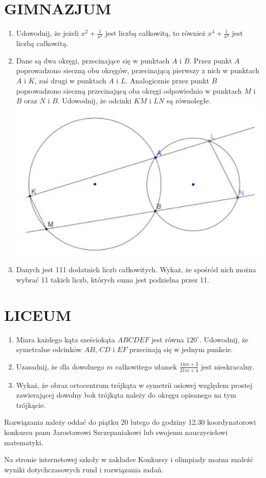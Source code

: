 \documentclass[10pt]{article}
\begin{document}
\section*{GIMNAZJUM}
\begin{enumerate}
  \item Udowodnij, że jeżeli \(x^{2}+\frac{1}{x^{2}}\) jest liczbą całkowitą, to również \(x^{4}+\frac{1}{x^{4}}\) jest liczbą całkowitą.
  \item Dane są dwa okręgi, przecinające się w punktach \(A\) i \(B\). Przez punkt \(A\) poprowadzono sieczną obu okręgów, przecinającą pierwszy z nich w punktach \(A\) i \(K\), zaś drugi w punktach \(A\) i \(L\). Analogicznie przez punkt \(B\) poprowadzono sieczną przecinającą oba okręgi odpowiednio w punktach \(M\) i \(B\) oraz \(N\) i \(B\). Udowodnij, że odcinki \(K M\) i \(L N\) są równoległe.\\
\includegraphics[max width=\textwidth, center]{2024_11_21_0d7cf2565ddbbb75f0d2g-1}
  \item Danych jest 111 dodatnich liczb całkowitych. Wykaż, że spośród nich można wybrać 11 takich liczb, których suma jest podzielna przez 11.
\end{enumerate}

\section*{LICEUM}
\begin{enumerate}
  \item Miara każdego kąta sześciokąta \(A B C D E F\) jest równa \(120^{\circ}\). Udowodnij, że symetralne odcinków \(A B\), \(C D\) i \(E F\) przecinają się w jednym punkcie.
  \item Uzasadnij, że dla dowolnego \(m\) całkowitego ułamek \(\frac{14 m+3}{21 m+4}\) jest nieskracalny.
  \item Wykaż, że obraz ortocentrum trójkąta w symetrii osiowej względem prostej zawierającej dowolny bok trójkąta należy do okręgu opisanego na tym trójkącie.
\end{enumerate}

Rozwiązania należy oddać do piątku 20 lutego do godziny 12.30 koordynatorowi konkursu panu Jarostawowi Szczepaniakowi lub swojemu nauczycielowi matematyki.

Na stronie internetowej szkoły w zakładce Konkursy i olimpiady można znaleźć wyniki dotychczasowych rund i rozwiązania zadań.
\end{document}
